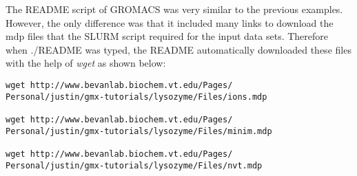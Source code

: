 The README script of GROMACS was very similar to the previous examples. However, the only difference was that it included many links to download the mdp
files that the SLURM script required for the input data sets. Therefore when ./README was typed, the README automatically downloaded these files with
the help of \emph{wget} as shown below:

\begin{tcolorbox}
\begin{Verbatim}[fontsize=\scriptsize]
wget http://www.bevanlab.biochem.vt.edu/Pages/
Personal/justin/gmx-tutorials/lysozyme/Files/ions.mdp

wget http://www.bevanlab.biochem.vt.edu/Pages/
Personal/justin/gmx-tutorials/lysozyme/Files/minim.mdp

wget http://www.bevanlab.biochem.vt.edu/Pages/
Personal/justin/gmx-tutorials/lysozyme/Files/nvt.mdp
\end{Verbatim}
\end{tcolorbox}


